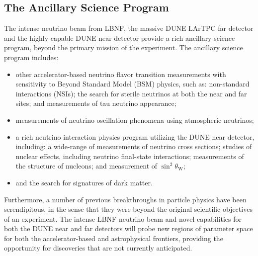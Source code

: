 \subsection{The Ancillary Science Program}

The intense neutrino beam from LBNF, the massive DUNE LArTPC far detector and the highly-capable DUNE near detector provide a rich ancillary science program, beyond the primary mission of the experiment. The ancillary science program includes:
\begin{itemize}
     \item other accelerator-based neutrino flavor transition measurements with sensitivity to Beyond Standard Model (BSM) physics, such as: non-standard interactions (NSIs); the search for sterile neutrinos at both the near and far sites;
 and measurements of tau neutrino appearance;
     \item measurements of neutrino oscillation phenomena using atmospheric neutrinos;
     \item a rich neutrino interaction physics program utilizing the DUNE near detector, including: a wide-range of measurements of neutrino cross sections; studies of nuclear effects, including neutrino final-state interactions; measurements of the structure of nucleons; and  measurement of $\sin^2\theta_\text{W}$;  
     \item  and the search for signatures of dark matter.
\end{itemize} 
Furthermore, a number of previous breakthroughs in particle physics have been serendipitous, in the sense that they were beyond the
original scientific objectives of an experiment. The intense LBNF neutrino beam and novel capabilities for both 
the DUNE near and far detectors will probe new regions of parameter space for both the accelerator-based and astrophysical frontiers, 
providing the opportunity for discoveries that are not currently anticipated.

%

